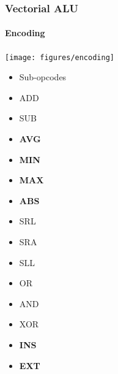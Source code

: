 \documentclass{beamer}
\begin{document}
\begin{frame}
  \frametitle{Vectorial ALU}
  \framesubtitle{Encoding}
  \begin{center}
    \texttt{[image: figures/encoding]}
  \end{center}
  \vspace{10pt}
  \begin{itemize}
    \item Sub-opcodes
  \end{itemize}

  \hspace{10pt}
  \begin{minipage}[c][1.6cm]{0.18\linewidth}
    \begin{itemize}
      \item ADD
      \item SUB
      \item \textbf{\color{hiBlue}AVG}
    \end{itemize}
  \end{minipage}
  \begin{minipage}[c][0cm]{0.18\linewidth}
    \begin{itemize}
      \item \textbf{\color{hiBlue}MIN}
      \item \textbf{\color{hiBlue}MAX}
      \item \textbf{\color{hiBlue}ABS}
    \end{itemize}
  \end{minipage}
  \begin{minipage}[c][0cm]{0.18\linewidth}
    \begin{itemize}
      \item SRL
      \item SRA
      \item SLL
    \end{itemize}
  \end{minipage}
  \begin{minipage}[c][0cm]{0.18\linewidth}
    \begin{itemize}
      \item OR
      \item AND
      \item XOR
    \end{itemize}
  \end{minipage}
  \begin{minipage}[c][0cm]{0.18\linewidth}
    \begin{itemize}
      \item \textbf{\color{hiBlue}INS}
      \item \textbf{\color{hiBlue}EXT}
    \end{itemize}
  \end{minipage}
  \vspace{40pt}
\end{frame}
\end{document}
